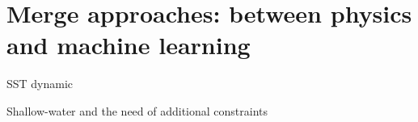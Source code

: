 \documentclass[handout]{beamer}
\begin{document}
\section{Merge approaches: between physics and machine learning}
\begin{frame}{SST dynamic}
    
\end{frame}
\begin{frame}{Shallow-water and the need of additional constraints}
    
\end{frame}

\begin{frame}{}
   
\end{frame}
    
\end{document}
